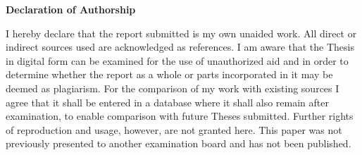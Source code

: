 \documentclass[12pt]{article}
\begin{document}
\Large
\noindent
\textbf{Declaration of Authorship} 
\vspace{0.5cm}
\noindent
\normalsize

I hereby declare that the report submitted is my own unaided work. All direct or 
indirect sources used are acknowledged as references. I am aware that the Thesis 
in digital form can be examined for the use of unauthorized aid and in order to 
determine whether the report as a whole or parts incorporated in it may be 
deemed as plagiarism. For the comparison of my work with existing sources I 
agree that it shall be entered in a database where it shall also remain after 
examination, to enable comparison with future Theses submitted. Further rights 
of reproduction and usage, however, are not granted here. This paper was not 
previously presented to another examination board and has not been published. 

\end{document}
